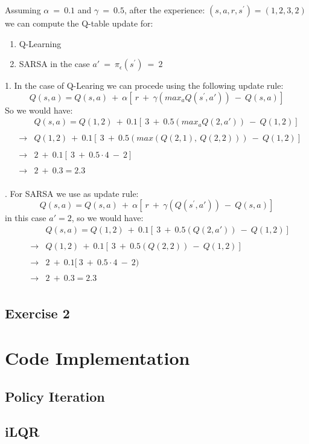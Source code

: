 \documentclass[10pt,a4paper]{article}
\begin{document}
\noindent Assuming $\alpha \:=\: 0.1$ and $\gamma \:=\: 0.5$, after the experience: $(s, a, r, s^{\prime}) = (1,2,3,2)$ we can compute the Q-table update for:
\begin{enumerate}
    \item Q-Learning 
    \item SARSA in the case $a' \:=\: \pi_{\epsilon}(s^{\prime}) \:=\: 2$
\end{enumerate} 
1. In the case of Q-Learing we can procede using the following update rule:
\begin{equation*}
    Q(s,a) = Q(s,a) \:+\: \alpha [ \:r \:+\: \gamma(max_{a}Q(s^{\prime},a')) \:-\: Q(s,a)]
\end{equation*}
So we would have:
\begin{align*}
    && Q(s,a) = Q(1,2) \:+\: 0.1 [ \:3 \:+\: 0.5(max_{a}Q(2,a')) \:-\: Q(1,2)] \\
    && \\
    &\rightarrow& Q(1,2) \:+\: 0.1 [ \:3 \:+\: 0.5(max(Q(2,1), \:Q(2,2))) \:-\: Q(1,2)] \\
    && \\
    &\rightarrow&2 \:+\: 0.1 [ \:3 \:+\: 0.5\cdot4 \:-\: 2] \\
    && \\
    &\rightarrow&2 \:+\: 0.3 = 2.3 \\
\end{align*}
\vspace{5pt}

. For SARSA we use as update rule:
\begin{equation*}
    Q(s,a) = Q(s,a) \:+\: \alpha [ \:r \:+\: \gamma(Q(s^{\prime},a')) \:-\: Q(s,a)]
\end{equation*}
in this case $a'=2$, so we would have:
\begin{align*}
    && Q(s,a) = Q(1,2) \:+\: 0.1 [ \:3 \:+\: 0.5(Q(2,a'))\:-\: Q(1,2)] \\
    && \\
    &\rightarrow& Q(1,2) \:+\: 0.1 [ \:3 \:+\: 0.5(Q(2,2))\:-\: Q(1,2)] \\
    && \\
    &\rightarrow&2 \:+\: 0.1 [ \:3 \:+\: 0.5\cdot4 \:-\: 2) \\
    && \\
    &\rightarrow&2 \:+\: 0.3 = 2.3 \\
\end{align*}
\newpage


\subsection{Exercise 2}

\newpage

\section{Code Implementation}
\subsection{Policy Iteration}

\newpage

\subsection{iLQR}
\end{document}
